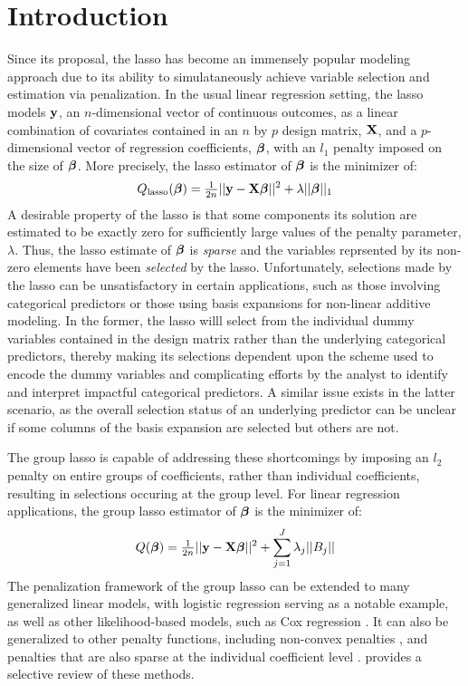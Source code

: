 \section{Introduction}

Since its proposal, the lasso \citep{tibshirani_1996} has become an immensely popular modeling approach due to its ability to simulataneously achieve variable selection and estimation via penalization. In the usual linear regression setting, the lasso models $\mathbf{y}$, an $n$-dimensional vector of continuous outcomes, as a linear combination of covariates contained in an $n$ by $p$ design matrix, $\mathbf{X}$, and a $p$-dimensional vector of regression coefficients, $\boldsymbol{\beta}$, with an $l_1$ penalty imposed on the size of $\boldsymbol{\beta}$. More precisely, the lasso estimator of $\boldsymbol{\beta}$ is the minimizer of:
\begin{equation*}
Q_{\text{lasso}}(\boldsymbol{\beta}) = \tfrac{1}{2n}||\mathbf{y} - \mathbf{X}\boldsymbol{\beta}||^2 + \lambda||\boldsymbol{\beta}||_1
\end{equation*}
A desirable property of the lasso is that some components its solution are estimated to be exactly zero for sufficiently large values of the penalty parameter, $\lambda$.  Thus, the lasso estimate of $\boldsymbol{\beta}$ is \textit{sparse} and the variables reprsented by its non-zero elements have been \textit{selected} by the lasso.  Unfortunately, selections made by the lasso can be unsatisfactory in certain applications, such as those involving categorical predictors or those using basis expansions for non-linear additive modeling.  In the former, the lasso willl select from the individual dummy variables contained in the design matrix rather than the underlying categorical predictors, thereby making its selections dependent upon the scheme used to encode the dummy variables and complicating efforts by the analyst to identify and interpret impactful categorical predictors.  A similar issue exists in the latter scenario, as the overall selection status of an underlying predictor can be unclear if some columns of the basis expansion are selected but others are not.

The group lasso \citep{Yuan2006} is capable of addressing these shortcomings by imposing an $l_2$ penalty on entire groups of coefficients, rather than individual coefficients, resulting in selections occuring at the group level.  For linear regression applications, the group lasso estimator of $\boldsymbol{\beta}$ is the minimizer of:
\begin{equation*}
Q(\boldsymbol{\beta}) = \tfrac{1}{2n}||\mathbf{y} - \mathbf{X}\boldsymbol{\beta}||^2 + \sum_{j = 1}^{J}\lambda_j ||B_j||
\end{equation*}
The penalization framework of the group lasso can be extended to many generalized linear models, with logistic regression \citep{meier2008} serving as a notable example, as well as other likelihood-based models, such as Cox regression \citep{Wang2009}.  It can also be generalized to other penalty functions, including non-convex penalties \citep{Breheny2012}, and penalties that are also sparse at the individual coefficient level \citep{Simon2013b}. \citet{Huang2012} provides a selective review of these methods.

